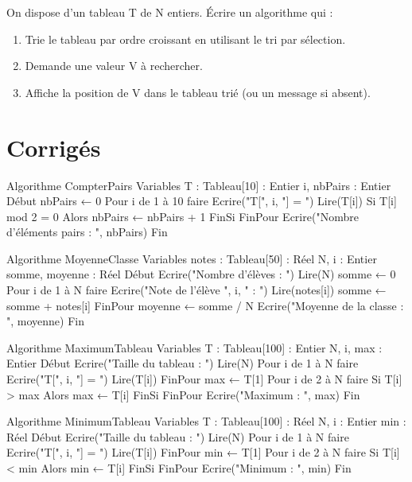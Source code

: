 \sujetbac[2021, Cameroun, E]
On dispose d'un tableau T de N entiers. Écrire un algorithme qui :
\begin{enumerate}
    \item Trie le tableau par ordre croissant en utilisant le tri par sélection.
    \item Demande une valeur V à rechercher.
    \item Affiche la position de V dans le tableau trié (ou un message si absent).
\end{enumerate}

\section{Corrigés}

\begin{algo}
Algorithme CompterPairs
Variables
    T : Tableau[10] : Entier
    i, nbPairs : Entier
Début
    nbPairs ← 0
    Pour i de 1 à 10 faire
        Ecrire("T[", i, "] = ")
        Lire(T[i])
        Si T[i] mod 2 = 0 Alors
            nbPairs ← nbPairs + 1
        FinSi
    FinPour
    Ecrire("Nombre d'éléments pairs : ", nbPairs)
Fin
\end{algo}

\begin{algo}
Algorithme MoyenneClasse
Variables
    notes : Tableau[50] : Réel
    N, i : Entier
    somme, moyenne : Réel
Début
    Ecrire("Nombre d'élèves : ")
    Lire(N)
    somme ← 0
    Pour i de 1 à N faire
        Ecrire("Note de l'élève ", i, " : ")
        Lire(notes[i])
        somme ← somme + notes[i]
    FinPour
    moyenne ← somme / N
    Ecrire("Moyenne de la classe : ", moyenne)
Fin
\end{algo}

\begin{algo}
Algorithme MaximumTableau
Variables
    T : Tableau[100] : Entier
    N, i, max : Entier
Début
    Ecrire("Taille du tableau : ")
    Lire(N)
    Pour i de 1 à N faire
        Ecrire("T[", i, "] = ")
        Lire(T[i])
    FinPour
    max ← T[1]
    Pour i de 2 à N faire
        Si T[i] > max Alors
            max ← T[i]
        FinSi
    FinPour
    Ecrire("Maximum : ", max)
Fin
\end{algo}

\begin{algo}
Algorithme MinimumTableau
Variables
    T : Tableau[100] : Réel
    N, i : Entier
    min : Réel
Début
    Ecrire("Taille du tableau : ")
    Lire(N)
    Pour i de 1 à N faire
        Ecrire("T[", i, "] = ")
        Lire(T[i])
    FinPour
    min ← T[1]
    Pour i de 2 à N faire
        Si T[i] < min Alors
            min ← T[i]
        FinSi
    FinPour
    Ecrire("Minimum : ", min)
Fin
\end{algo}

